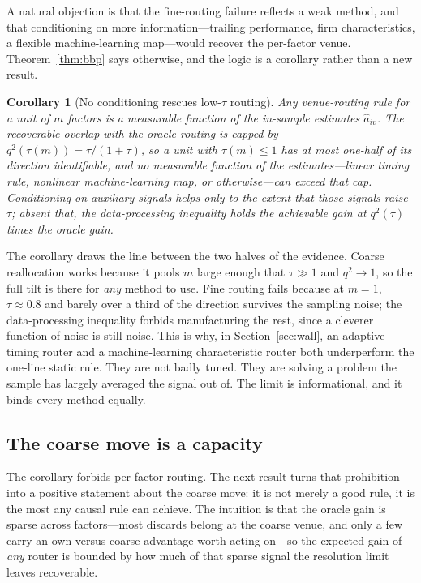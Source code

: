 \documentclass[12pt]{article}
\theoremstyle{plain}
\newtheorem{corollary}{Corollary}
\theoremstyle{definition}
\begin{document}
A natural objection is that the fine-routing failure reflects a weak method, and
that conditioning on more information---trailing performance, firm
characteristics, a flexible machine-learning map---would recover the per-factor
venue. Theorem~\ref{thm:bbp} says otherwise, and the logic is a corollary rather
than a new result.

\begin{corollary}[No conditioning rescues low-$\tau$ routing]
\label{cor:ml}
Any venue-routing rule for a unit of $m$ factors is a measurable function of the
in-sample estimates $\hat a_{iv}$. The recoverable overlap with the oracle
routing is capped by $q^2(\tau(m))=\tau/(1+\tau)$, so a unit with $\tau(m)\le 1$
has at most one-half of its direction identifiable, and no measurable function of
the estimates---linear timing rule, nonlinear machine-learning map, or
otherwise---can exceed that cap. Conditioning on auxiliary signals helps only to
the extent that those signals raise $\tau$; absent that, the data-processing
inequality holds the achievable gain at $q^2(\tau)$ times the oracle gain.
\end{corollary}

\noindent The corollary draws the line between the two halves of the evidence.
Coarse reallocation works because it pools $m$ large enough that $\tau\gg1$ and
$q^2\to1$, so the full tilt is there for \emph{any} method to use. Fine routing
fails because at $m=1$, $\tau\approx0.8$ and barely over a third of the direction
survives the sampling noise; the data-processing inequality forbids manufacturing
the rest, since a cleverer function of noise is still noise. This is why, in
Section~\ref{sec:wall}, an adaptive timing router and a machine-learning
characteristic router both underperform the one-line static rule. They are not
badly tuned. They are solving a problem the sample has largely averaged the
signal out of. The limit is informational, and it binds every method equally.

\subsection{The coarse move is a capacity}

The corollary forbids per-factor routing. The next result turns that prohibition
into a positive statement about the coarse move: it is not merely a good rule, it
is the most any causal rule can achieve. The intuition is that the oracle gain is
sparse across factors---most discards belong at the coarse venue, and only a few
carry an own-versus-coarse advantage worth acting on---so the expected gain of
\emph{any} router is bounded by how much of that sparse signal the resolution
limit leaves recoverable.
\end{document}
